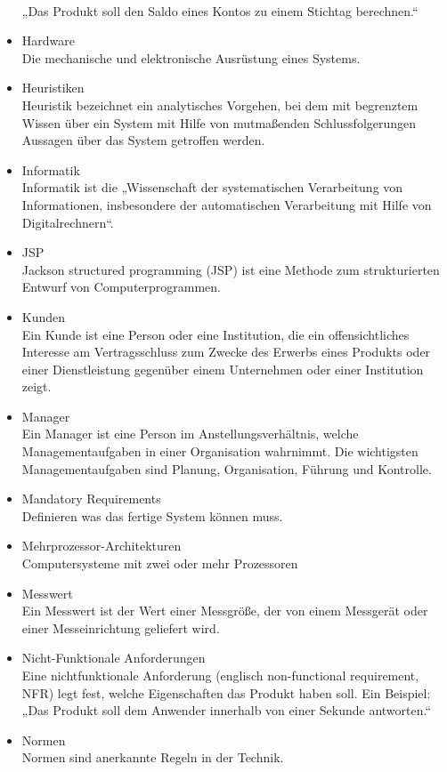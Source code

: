 \begin{itemize}
\\
„Das Produkt soll den Saldo eines Kontos zu einem Stichtag berechnen.“
\item 	Hardware\\
Die mechanische und elektronische Ausrüstung eines Systems.
\item Heuristiken \\ Heuristik bezeichnet ein analytisches Vorgehen, bei dem mit begrenztem Wissen über ein System mit Hilfe von mutmaßenden Schlussfolgerungen Aussagen über das System getroffen werden.
\item 	Informatik\\Informatik ist die „Wissenschaft der systematischen Verarbeitung von Informationen, insbesondere der automatischen Verarbeitung mit Hilfe von Digitalrechnern“.
\item 	JSP\\Jackson structured programming (JSP) ist eine Methode zum strukturierten Entwurf von Computerprogrammen.
\item 	Kunden\\Ein Kunde ist eine Person oder eine Institution, die ein offensichtliches Interesse am Vertragsschluss zum Zwecke des Erwerbs eines Produkts oder einer Dienstleistung gegenüber einem Unternehmen oder einer Institution zeigt.
\item 	Manager\\
Ein Manager ist eine Person im Anstellungsverhältnis, welche Managementaufgaben in einer Organisation wahrnimmt. Die wichtigsten Managementaufgaben sind Planung, Organisation, Führung und Kontrolle.
\item 	Mandatory Requirements\\
Definieren was das fertige System können muss.
\item 	Mehrprozessor-Architekturen\\
Computersysteme mit zwei oder mehr Prozessoren
\item 	Messwert\\Ein Messwert ist der Wert einer Messgröße, der von einem Messgerät oder einer Messeinrichtung geliefert wird.
\item 	Nicht-Funktionale Anforderungen\\
Eine nichtfunktionale Anforderung (englisch non-functional requirement, NFR) legt fest, welche Eigenschaften das Produkt haben soll. Ein Beispiel:
\\
„Das Produkt soll dem Anwender innerhalb von einer Sekunde antworten.“
\item 	Normen\\Normen sind anerkannte Regeln in der Technik. 

\end{itemize}
